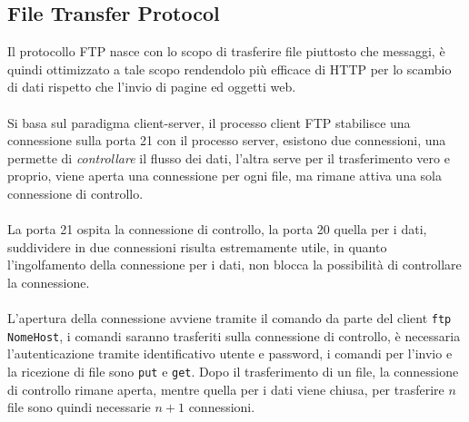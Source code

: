 \documentclass[12pt, letterpaper]{article}
\newcommand{\code}[1]{\colorbox{light-gray}{\texttt{#1}}}
\newcommand{\acc}{\\\hphantom{}\\}
\begin{document}
\subsection{File Transfer Protocol}
Il protocollo FTP nasce con lo scopo di trasferire file piuttosto che messaggi, è quindi ottimizzato a tale 
scopo rendendolo più efficace di HTTP per lo scambio di dati rispetto che l'invio di pagine ed 
oggetti web.\acc 
Si basa sul paradigma client-server, il processo client FTP stabilisce una connessione 
sulla porta 21 con il processo server, esistono due connessioni, una permette di \textit{controllare} il 
flusso dei dati, l'altra serve per il trasferimento vero e proprio, viene aperta una connessione per ogni file,
ma rimane attiva una sola connessione di controllo.\acc 
La porta 21 ospita la connessione di controllo, la porta 20 quella per i dati, suddividere in due connessioni 
risulta estremamente utile, in quanto l'ingolfamento della connessione per i dati, non blocca la possibilità 
di controllare la connessione.\acc L'apertura della connessione avviene tramite il comando da parte del 
client \code{ftp NomeHost}, i comandi saranno trasferiti sulla connessione di controllo, è necessaria 
l'autenticazione tramite identificativo utente e password, i comandi per l'invio e la ricezione di file sono 
\code{put} e \code{get}. Dopo il trasferimento di un file, la connessione di controllo rimane aperta, mentre 
quella per i dati viene chiusa, per trasferire $n$ file sono quindi necessarie $n+1$ connessioni.
\end{document}
